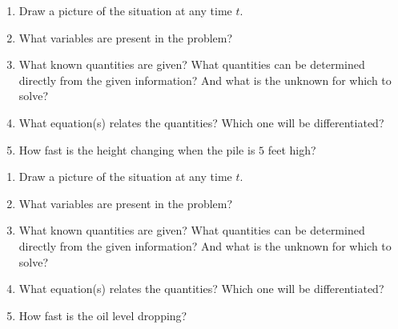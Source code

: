 \begin{enumerate}[label=\hspace{11pt}(\alph*), align=left, leftmargin=*, labelsep=0.25em]
    \item Draw a picture of the situation at any time $t$.
    \item What variables are present in the problem?
    \item What known quantities are given? What quantities can be determined directly from the given information? And what is the unknown for which to solve?
    \item What equation(s) relates the quantities? Which one will be differentiated?
    \item How fast is the height changing when the pile is $5$ feet high?
\end{enumerate} \vspace{11pt}

\begin{enumerate}[label=\hspace{11pt}(\alph*), align=left, leftmargin=*, labelsep=0.25em]
    \item Draw a picture of the situation at any time $t$.
    \item What variables are present in the problem?
    \item What known quantities are given? What quantities can be determined directly from the given information? And what is the unknown for which to solve?
    \item What equation(s) relates the quantities? Which one will be differentiated?
    \item How fast is the oil level dropping?
\end{enumerate} \vspace{11pt}

